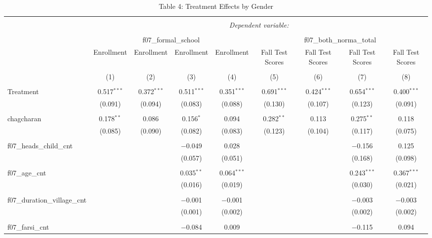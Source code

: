 \documentclass[
]{article}
\begin{document}
\begin{table}[!htbp] \centering 
  \caption{Table 4: Treatment Effects by Gender} 
  \label{} 
\begin{tabular}{@{\extracolsep{5pt}}lcccccccc} 
\\[-1.8ex]\hline 
\hline \\[-1.8ex] 
 & \multicolumn{8}{c}{\textit{Dependent variable:}} \\ 
\cline{2-9} 
\\[-1.8ex] & \multicolumn{4}{c}{f07\_formal\_school} & \multicolumn{4}{c}{f07\_both\_norma\_total} \\ 
 & Enrollment & Enrollment & Enrollment & Enrollment & Fall Test Scores & Fall Test Scores & Fall Test Scores & Fall Test Scores \\ 
\\[-1.8ex] & (1) & (2) & (3) & (4) & (5) & (6) & (7) & (8)\\ 
\hline \\[-1.8ex] 
 Treatment & 0.517$^{***}$ & 0.372$^{***}$ & 0.511$^{***}$ & 0.351$^{***}$ & 0.691$^{***}$ & 0.424$^{***}$ & 0.654$^{***}$ & 0.400$^{***}$ \\ 
  & (0.091) & (0.094) & (0.083) & (0.088) & (0.130) & (0.107) & (0.123) & (0.091) \\ 
  & & & & & & & & \\ 
 chagcharan & 0.178$^{**}$ & 0.086 & 0.156$^{*}$ & 0.094 & 0.282$^{**}$ & 0.113 & 0.275$^{**}$ & 0.118 \\ 
  & (0.085) & (0.090) & (0.082) & (0.083) & (0.123) & (0.104) & (0.117) & (0.075) \\ 
  & & & & & & & & \\ 
 f07\_heads\_child\_cnt &  &  & $-$0.049 & 0.028 &  &  & $-$0.156 & 0.125 \\ 
  &  &  & (0.057) & (0.051) &  &  & (0.168) & (0.098) \\ 
  & & & & & & & & \\ 
 f07\_age\_cnt &  &  & 0.035$^{**}$ & 0.064$^{***}$ &  &  & 0.243$^{***}$ & 0.367$^{***}$ \\ 
  &  &  & (0.016) & (0.019) &  &  & (0.030) & (0.021) \\ 
  & & & & & & & & \\ 
 f07\_duration\_village\_cnt &  &  & $-$0.001 & $-$0.001 &  &  & $-$0.003 & $-$0.003 \\ 
  &  &  & (0.001) & (0.002) &  &  & (0.002) & (0.002) \\ 
  & & & & & & & & \\ 
 f07\_farsi\_cnt &  &  & $-$0.084 & 0.009 &  &  & $-$0.115 & 0.094 \\ 

\end{tabular}
\end{table}
\end{document}
